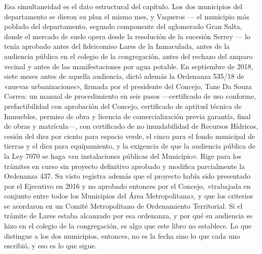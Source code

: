 Esa simultaneidad es el dato estructural del capítulo. Los dos municipios del departamento se dieron su plan el mismo mes, y Vaqueros --- el municipio más poblado del departamento, segundo componente del aglomerado Gran Salta, donde el mercado de suelo opera desde la resolución de la sucesión Serrey --- lo tenía aprobado antes del fideicomiso Lares de la Inmaculada, antes de la audiencia pública en el colegio de la congregación, antes del rechazo del amparo vecinal y antes de las manifestaciones por agua potable. En septiembre de 2018, siete meses antes de aquella audiencia, dictó además la Ordenanza 535/18 de «nuevas urbanizaciones», firmada por el presidente del Concejo, Tane Da Souza Correa: un manual de procedimiento en seis pasos ---certificado de uso conforme, prefactibilidad con aprobación del Concejo, certificado de aptitud técnica de Inmuebles, permiso de obra y licencia de comercialización previa garantía, final de obras y matrícula---, con certificado de no inundabilidad de Recursos Hídricos, cesión del diez por ciento para espacio verde, el cinco para el fondo municipal de tierras y el diez para equipamiento, y la exigencia de que la audiencia pública de la Ley 7070 se haga «en instalaciones públicas del Municipio». Rige para los trámites en curso sin proyecto definitivo aprobado y modifica parcialmente la Ordenanza 437. Su visto registra además que el proyecto había sido presentado por el Ejecutivo en 2016 y no aprobado entonces por el Concejo, «trabajada en conjunto entre todos los Municipios del Área Metropolitana», y que los criterios se acordaron en un Comité Metropolitano de Ordenamiento Territorial. Si el trámite de Lares estaba alcanzado por esa ordenanza, y por qué su audiencia se hizo en el colegio de la congregación, es algo que este libro no establece. Lo que distingue a los dos municipios, entonces, no es la fecha sino lo que cada uno escribió, y eso es lo que sigue.

